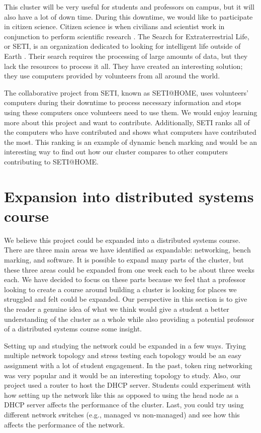\documentclass[12pt]{article}
\begin{document}
This cluster will be very useful for students and professors on campus, but it will also have a lot of down time. During this downtime, we would like to participate in citizen science. Citizen science is when civilians and scientist work in conjunction to perform scientific research \cite{national}. The Search for Extraterrestrial Life, or SETI, is an organization dedicated to looking for intelligent life outside of Earth \cite{setiinstitute}. Their search requires the processing of large amounts of data, but they lack the resources to process it all. They have created an interesting solution; they use computers provided by volunteers from all around the world. 

The collaborative project from SETI, known as SETI@HOME, uses volunteers' computers during their downtime to process necessary information and stops using these computers once volunteers need to use them. We would enjoy learning more about this project and want to contribute. Additionally, SETI ranks all of the computers who have contributed and shows what computers have contributed the most. This ranking is an example of dynamic bench marking and would be an interesting way to find out how our cluster compares to other computers contributing to SETI@HOME.

%
%
\section{Expansion into distributed systems course}
\label{sec:expansion}   %

We believe this project could be expanded into a distributed systems course. There are three main areas we have identified as expandable: networking, bench marking, and software. It is possible to expand many parts of the cluster, but these three areas could be expanded from one week each to be about three weeks each. We have decided to focus on these parts because we feel that a professor looking to create a course around building a cluster is looking for places we struggled and felt could be expanded. Our perspective in this section is to give the reader a genuine idea of what we think would give a student a better understanding of the cluster as a whole while also providing a potential professor of a distributed systems course some insight.  

Setting up and studying the network could be expanded in a few ways. Trying multiple network topology and stress testing each topology would be an easy assignment with a lot of student engagement. In the past, token ring networking was very popular and it would be an interesting topology to study. Also, our project used a router to host the DHCP server. Students could experiment with how setting up the network like this as opposed to using the head node as a DHCP server affects the performance of the cluster. Last, you could try using different network switches (e.g., managed vs non-managed) and see how this affects the performance of the network.
\end{document}
